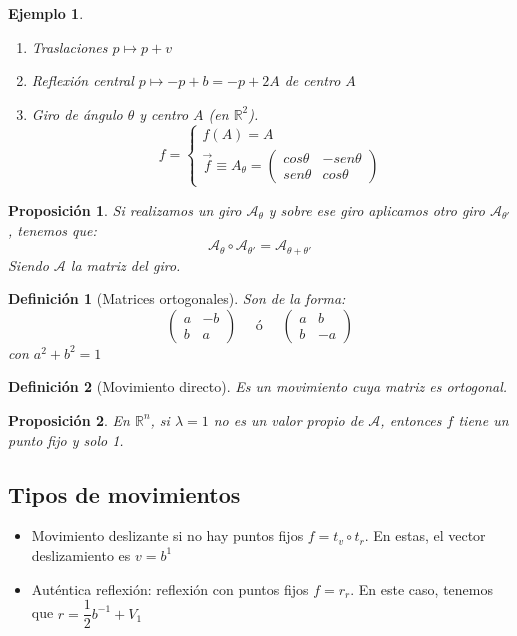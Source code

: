\documentclass[11pt, a4paper]{article}
\newif\IfInSansMode
\newcommand{\R}{\mathbb{R}}
\renewcommand{\vec}{\overrightarrow}
\theoremstyle{theorem-style}
\newtheorem{nprop}{Proposición}[section]
\theoremstyle{definition-style}
\newtheorem{ndef}{Definición}[section]
\theoremstyle{remark-style}
\theoremstyle{example-style}
\newtheorem{ejemplo}{Ejemplo}[section]
\newenvironment{nlist}
{\begin{enumerate}
    \renewcommand\labelenumi{(\emph{\roman{enumi})}}}
  {\end{enumerate}}
\begin{document}
\begin{ejemplo}
  \begin{nlist}
  \item Traslaciones $p \mapsto p+v$
  \item Reflexión central $p \mapsto -p +b= -p +2A$ de centro $A$
  \item Giro de ángulo $\theta$ y centro $A$ (en $\R^2$).
    \[
      f= \begin{cases}
	f(A) = A \\
	\vec{f} \equiv A_{\theta} = \begin{pmatrix}
          cos \theta & -sen \theta\\
          sen \theta & cos \theta
        \end{pmatrix} 
      \end{cases}
    \]
  \end{nlist}
\end{ejemplo}

\begin{nprop}
  Si realizamos un giro $\mathcal A_\theta$ y sobre ese giro aplicamos otro giro $\mathcal A_{\theta'}$, tenemos que:
  \[
    \mathcal A_{\theta} \circ \mathcal A_{\theta'} = \mathcal A_{\theta+\theta'}
  \]
  Siendo $\mathcal A$ la matriz del giro.
\end{nprop}

\begin{ndef}[Matrices ortogonales]
  Son de la forma:
  \[
    \begin{pmatrix}
      a & -b \\
      b & a 
    \end{pmatrix} \quad \text { ó } \quad \begin{pmatrix}
      a & b \\
      b & -a 
    \end{pmatrix}
  \]
  con $a^2+b^2 = 1$
\end{ndef}

\begin{ndef}[Movimiento directo]
  Es un movimiento cuya matriz es ortogonal. 
\end{ndef}
\begin{nprop}
  En $\R^n$, si $\lambda = 1$ no es un valor propio de $\mathcal A$, entonces $f$ tiene un punto fijo y solo 1.
\end{nprop}

\subsection{Tipos de movimientos}
\begin{itemize}
\item Movimiento deslizante si no hay puntos fijos $f = t_v \circ t_r$. En estas, el vector deslizamiento es $v=b^1$
\item Auténtica reflexión: reflexión con puntos fijos $f=r_r$. En este caso, tenemos que $r= \dfrac{1}{2}b^{-1}+V_1$
\end{itemize}
\end{document}
